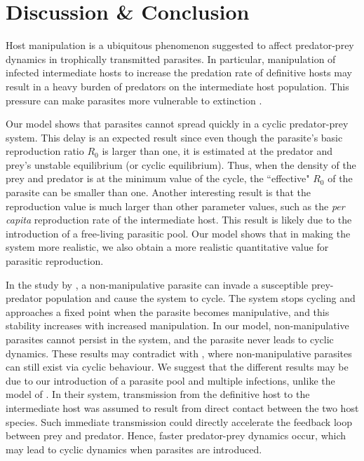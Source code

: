 \documentclass[a4paper]{scrartcl}
\begin{document}
\section*{Discussion \& Conclusion}
Host manipulation is a ubiquitous phenomenon suggested to affect predator-prey dynamics in trophically transmitted parasites. 
In particular, manipulation of infected intermediate hosts to increase the predation rate of definitive hosts may result in a heavy burden of predators on the intermediate host population.
This pressure can make parasites more vulnerable to extinction \citep{Hadeler1989,Fenton2006}. 

Our model shows that parasites cannot spread quickly in a cyclic predator-prey system. 
This delay is an expected result since even though the parasite's basic reproduction ratio $R_0$ is larger than one, it is estimated at the predator and prey's unstable equilibrium (or cyclic equilibrium). 
Thus, when the density of the prey and predator is at the minimum value of the cycle, the ``effective" $R_0$ of the parasite can be smaller than one. 
Another interesting result is that the reproduction value is much larger than other parameter values, such as the \textit{per capita} reproduction rate of the intermediate host.
This result is likely due to the introduction of a free-living parasitic pool. 
Our model shows that in making the system more realistic, we also obtain a more realistic quantitative value for parasitic reproduction.

In the study by \cite{Rogawa2018}, a non-manipulative parasite can invade a susceptible prey-predator population and cause the system to cycle. 
The system stops cycling and approaches a fixed point when the parasite becomes manipulative, and this stability increases with increased manipulation.
In our model, non-manipulative parasites cannot persist in the system, and the parasite never leads to cyclic dynamics. 
These results may contradict with \cite{Rogawa2018}, where non-manipulative parasites can still exist via cyclic behaviour. 
We suggest that the different results may be due to our introduction of a parasite pool and multiple infections, unlike the model of \cite{Rogawa2018}. 
In their system, transmission from the definitive host to the intermediate host was assumed to result from direct contact between the two host species. 
Such immediate transmission could directly accelerate the feedback loop between prey and predator. 
Hence, faster predator-prey dynamics occur, which may lead to cyclic dynamics when parasites are introduced.
\end{document}
